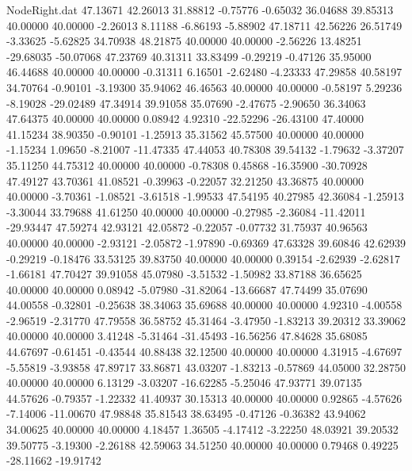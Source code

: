 \begin{filecontents}{NodeRight.dat}
  47.13671   42.26013   31.88812    -0.75776   -0.65032   36.04688   39.85313   40.00000   40.00000   -2.26013    8.11188   -6.86193   -5.88902
  47.18711   42.56226   26.51749    -3.33625   -5.62825   34.70938   48.21875   40.00000   40.00000   -2.56226   13.48251  -29.68035  -50.07068
  47.23769   40.31311   33.83499    -0.29219   -0.47126   35.95000   46.44688   40.00000   40.00000   -0.31311    6.16501   -2.62480   -4.23333
  47.29858   40.58197   34.70764    -0.90101   -3.19300   35.94062   46.46563   40.00000   40.00000   -0.58197    5.29236   -8.19028  -29.02489
  47.34914   39.91058   35.07690    -2.47675   -2.90650   36.34063   47.64375   40.00000   40.00000    0.08942    4.92310  -22.52296  -26.43100
  47.40000   41.15234   38.90350    -0.90101   -1.25913   35.31562   45.57500   40.00000   40.00000   -1.15234    1.09650   -8.21007  -11.47335
  47.44053   40.78308   39.54132    -1.79632   -3.37207   35.11250   44.75312   40.00000   40.00000   -0.78308    0.45868  -16.35900  -30.70928
  47.49127   43.70361   41.08521    -0.39963   -0.22057   32.21250   43.36875   40.00000   40.00000   -3.70361   -1.08521   -3.61518   -1.99533
  47.54195   40.27985   42.36084    -1.25913   -3.30044   33.79688   41.61250   40.00000   40.00000   -0.27985   -2.36084  -11.42011  -29.93447
  47.59274   42.93121   42.05872    -0.22057   -0.07732   31.75937   40.96563   40.00000   40.00000   -2.93121   -2.05872   -1.97890   -0.69369
  47.63328   39.60846   42.62939    -0.29219   -0.18476   33.53125   39.83750   40.00000   40.00000    0.39154   -2.62939   -2.62817   -1.66181
  47.70427   39.91058   45.07980    -3.51532   -1.50982   33.87188   36.65625   40.00000   40.00000    0.08942   -5.07980  -31.82064  -13.66687
  47.74499   35.07690   44.00558    -0.32801   -0.25638   38.34063   35.69688   40.00000   40.00000    4.92310   -4.00558   -2.96519   -2.31770
  47.79558   36.58752   45.31464    -3.47950   -1.83213   39.20312   33.39062   40.00000   40.00000    3.41248   -5.31464  -31.45493  -16.56256
  47.84628   35.68085   44.67697    -0.61451   -0.43544   40.88438   32.12500   40.00000   40.00000    4.31915   -4.67697   -5.55819   -3.93858
  47.89717   33.86871   43.03207    -1.83213   -0.57869   44.05000   32.28750   40.00000   40.00000    6.13129   -3.03207  -16.62285   -5.25046
  47.93771   39.07135   44.57626    -0.79357   -1.22332   41.40937   30.15313   40.00000   40.00000    0.92865   -4.57626   -7.14006  -11.00670
  47.98848   35.81543   38.63495    -0.47126   -0.36382   43.94062   34.00625   40.00000   40.00000    4.18457    1.36505   -4.17412   -3.22250
  48.03921   39.20532   39.50775    -3.19300   -2.26188   42.59063   34.51250   40.00000   40.00000    0.79468    0.49225  -28.11662  -19.91742

\end{filecontents}
